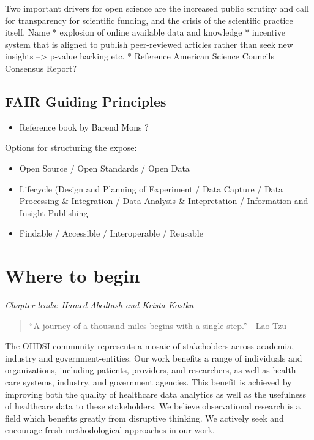 \documentclass[11pt]{book}
\providecommand{\tightlist}{%
  \setlength{\itemsep}{0pt}\setlength{\parskip}{0pt}}
\theoremstyle{definition}
\theoremstyle{definition}
\theoremstyle{definition}
\theoremstyle{remark}
\begin{document}
Two important drivers for open science are the increased public scrutiny and call for transparency for scientific funding, and the crisis of the scientific practice itself.
Name
* explosion of online available data and knowledge
* incentive system that is aligned to publish peer-reviewed articles rather than seek new insights --\textgreater{} p-value hacking etc.
* Reference American Science Councils Consensus Report?

\hypertarget{fair-guiding-principles}{%
\section{FAIR Guiding Principles}\label{fair-guiding-principles}}

\begin{itemize}
\tightlist
\item
  Reference book by Barend Mons \citet{barendmons2018}?
\end{itemize}

Options for structuring the expose:

\begin{itemize}
\tightlist
\item
  Open Source / Open Standards / Open Data
\item
  Lifecycle (Design and Planning of Experiment / Data Capture / Data Processing \& Integration / Data Analysis \& Intepretation / Information and Insight Publishing
\item
  Findable / Accessible / Interoperable / Reusable
\end{itemize}

\hypertarget{WhereToBegin}{%
\chapter{Where to begin}\label{WhereToBegin}}

\emph{Chapter leads: Hamed Abedtash and Krista Kostka}

\begin{quote}
``A journey of a thousand miles begins with a single step.'' - Lao Tzu
\end{quote}

The OHDSI community represents a mosaic of stakeholders across academia, industry and government-entities. Our work benefits a range of individuals and organizations, including patients, providers, and researchers, as well as health care systems, industry, and government agencies. This benefit is achieved by improving both the quality of healthcare data analytics as well as the usefulness of healthcare data to these stakeholders. We believe observational research is a field which benefits greatly from disruptive thinking. We actively seek and encourage fresh methodological approaches in our work.
\end{document}
